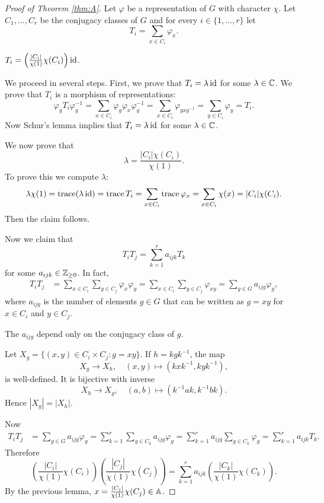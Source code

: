 \begin{proof}[Proof of Theorem \ref{thm:A}]
    Let $\varphi$ be a representation of $G$ with character $\chi$. 
    Let $C_1,\dots,C_r$ be the conjugacy classes of $G$ 
    and for every $i\in\{1,\dots,r\}$ let 
    \[
    T_i=\sum_{x\in C_i}\varphi_x. 
    \]
    
    \begin{claim}
        $T_i=\left(\frac{|C_i|}{\chi(1)}\chi(C_i)\right)\operatorname{id}$. 
    \end{claim}
    
    We proceed in several steps. First, we prove that 
    $T_i=\lambda\operatorname{id}$ for some $\lambda\in\mathbb{C}$. 
    We prove that $T_i$ is a morphism of representations:
    \[
    \varphi_gT_i\varphi_g^{-1}=\sum_{x\in C_i}\varphi_g\varphi_x\varphi_g^{-1}
    =\sum_{x\in C_i}\varphi_{gxg^{-1}}=\sum_{y\in C_i}\varphi_y=T_i.
    \]
    Now Schur's lemma implies that $T_i=\lambda\operatorname{id}$ for some
    $\lambda\in\mathbb{C}$. 
    
    We now prove that 
    \[
    \lambda=\frac{|C_i|\chi(C_i)}{\chi(1)}.
    \]
    To prove
    this we compute $\lambda$:
    \[
    \lambda\chi(1)=\operatorname{trace}(\lambda\operatorname{id})
    =\operatorname{trace} T_i
    =\sum_{x\in C_i}\operatorname{trace}\varphi_x
    =\sum_{x\in C_i}\chi(x)
    =|C_i|\chi(C_i).
    \]
    Then the claim follows. 
    
    Now we claim that 
    \[
    T_iT_j=\sum_{k=1}^r a_{ijk}T_k
    \]
    for some $a_{ijk}\in\mathbb{Z}_{\geq0}$. In fact, 
    \begin{align*}
        T_iT_j &= \sum_{x\in C_i}\sum_{y\in C_j}\varphi_x\varphi_y
        =\sum_{x\in C_i}\sum_{y\in C_j}\varphi_{xy}
        =\sum_{g\in G}a_{ijg}\varphi_g,
    \end{align*}
    where $a_{ijg}$ is the number of elements $g\in G$ 
    that can be written 
    as $g=xy$ for $x\in C_i$ and $y\in C_j$. 
    
    \begin{claim}
        The $a_{ijg}$ depend only on the conjugacy class of $g$.
    \end{claim}
    
    Let $X_g=\{(x,y)\in C_i\times C_j:g=xy\}$. If $h=kgk^{-1}$, the map
    \[
    X_g\to X_h,\quad (x,y)\mapsto (kxk^{-1},kyk^{-1}),
    \]
    is well-defined. It is bijective with inverse
    \[
    X_h\to X_g,\quad
    (a,b)\mapsto (k^{-1}ak,k^{-1}bk).
    \]
    Hence $|X_g|=|X_h|$. 
    
    Now 
    \begin{align*}
        T_iT_j & 
        =\sum_{g\in G}a_{ijg}\varphi_g
        =\sum_{k=1}^r\sum_{g\in C_k}a_{ijg}\varphi_g
        =\sum_{k=1}^ra_{ijg}\sum_{g\in C_k}\varphi_g
        =\sum_{k=1}^ra_{ijk}T_k.
    \end{align*}
    Therefore 
    \begin{equation}
        \label{eq:omega}
    \left(\frac{|C_i|}{\chi(1)}\chi(C_i)\right)
    \left(\frac{|C_j|}{\chi(1)}\chi(C_j)\right)
    =\sum_{k=1}^r a_{ijk}\left(\frac{|C_k|}{\chi(1)}\chi(C_k)\right).
    \end{equation}
    By the previous lemma, $x=\frac{|C_j|}{\chi(1)}\chi(C_j)\in\mathbb{A}$.
\end{proof}

